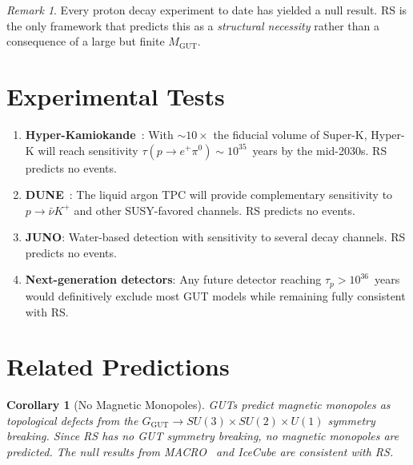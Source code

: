 \documentclass[12pt,a4paper]{article}
\newtheorem{corollary}[theorem]{Corollary}
\theoremstyle{definition}
\theoremstyle{remark}
\newtheorem{remark}[theorem]{Remark}
\begin{document}
\begin{remark}
Every proton decay experiment to date has yielded a null
result.  RS is the only framework that predicts this as a
\emph{structural necessity} rather than a consequence of a
large but finite $M_{\mathrm{GUT}}$.
\end{remark}

\section{Experimental Tests}
\label{sec:experiments}

\begin{enumerate}
  \item \textbf{Hyper-Kamiokande}~\cite{HyperK}: With
  $\sim 10\times$ the fiducial volume of Super-K, Hyper-K
  will reach sensitivity
  $\tau(p \to e^+\pi^0) \sim 10^{35}$~years by the
  mid-2030s.  RS predicts no events.

  \item \textbf{DUNE}~\cite{DUNE}: The liquid argon TPC
  will provide complementary sensitivity to
  $p \to \bar{\nu} K^+$ and other SUSY-favored channels.
  RS predicts no events.

  \item \textbf{JUNO}: Water-based detection with
  sensitivity to several decay channels.  RS predicts
  no events.

  \item \textbf{Next-generation detectors}: Any future
  detector reaching $\tau_p > 10^{36}$~years would
  definitively exclude most GUT models while remaining
  fully consistent with RS.
\end{enumerate}

\section{Related Predictions}
\label{sec:related}

\begin{corollary}[No Magnetic Monopoles]
\label{cor:monopoles}
GUTs predict magnetic monopoles as topological defects from
the $G_{\mathrm{GUT}} \to SU(3) \times SU(2) \times U(1)$
symmetry breaking.  Since RS has no GUT symmetry breaking,
no magnetic monopoles are predicted.  The null results from
MACRO~\cite{MACRO2002} and IceCube are consistent with RS.
\end{corollary}
\end{document}
